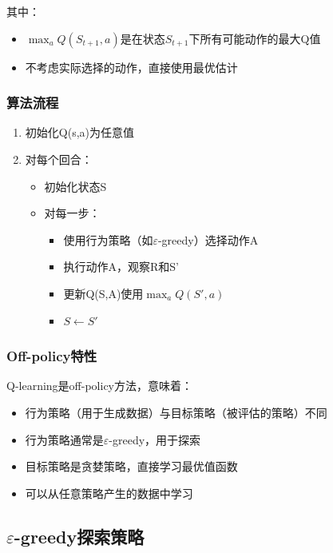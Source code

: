 \documentclass[12pt,a4paper]{article}
\begin{document}
其中：
\begin{itemize}
    \item $\max_a Q(S_{t+1}, a)$是在状态$S_{t+1}$下所有可能动作的最大Q值
    \item 不考虑实际选择的动作，直接使用最优估计
\end{itemize}

\subsubsection{算法流程}

\begin{enumerate}
    \item 初始化Q(s,a)为任意值
    \item 对每个回合：
    \begin{itemize}
        \item 初始化状态S
        \item 对每一步：
        \begin{itemize}
            \item 使用行为策略（如$\varepsilon$-greedy）选择动作A
            \item 执行动作A，观察R和S'
            \item 更新Q(S,A)使用$\max_a Q(S',a)$
            \item $S \leftarrow S'$
        \end{itemize}
    \end{itemize}
\end{enumerate}

\subsubsection{Off-policy特性}

Q-learning是off-policy方法，意味着：
\begin{itemize}
    \item 行为策略（用于生成数据）与目标策略（被评估的策略）不同
    \item 行为策略通常是$\varepsilon$-greedy，用于探索
    \item 目标策略是贪婪策略，直接学习最优值函数
    \item 可以从任意策略产生的数据中学习
\end{itemize}

\subsection{$\varepsilon$-greedy探索策略}
\end{document}

